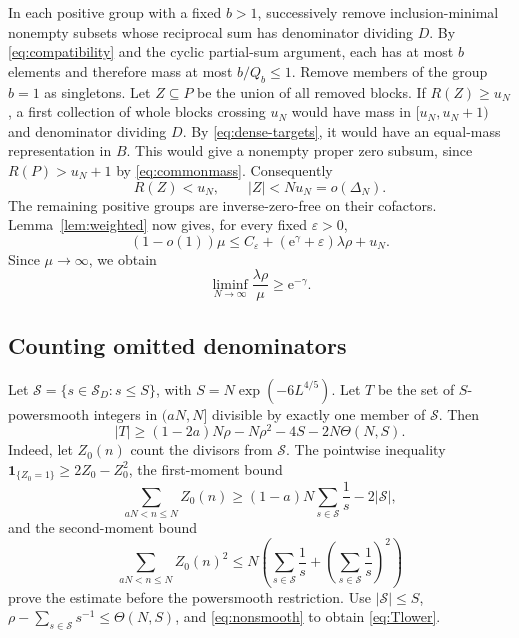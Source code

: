 \documentclass[11pt,leqno]{amsart}
\numberwithin{equation}{section}
\theoremstyle{definition}
\theoremstyle{remark}
\newcommand{\e}{\mathrm e}
\newcommand{\eps}{\varepsilon}
\newcommand{\ind}{\mathbf 1}
\newcommand{\card}[1]{\lvert #1\rvert}
\begin{document}
In each positive group with a fixed $b>1$, successively remove
inclusion-minimal nonempty subsets whose reciprocal sum has denominator
dividing $D$. By \eqref{eq:compatibility} and the cyclic partial-sum
argument, each has at most $b$ elements and therefore mass at most
$b/Q_b\le1$. Remove members of the group $b=1$ as singletons.
Let $Z\subseteq P$ be the union of all removed blocks.
If $R(Z)\ge u_N$, a first collection of whole blocks crossing $u_N$
would have mass in $[u_N,u_N+1)$ and denominator dividing $D$.
By \eqref{eq:dense-targets}, it would have an equal-mass representation
in $B$. This would give a nonempty proper zero subsum, since
$R(P)>u_N+1$ by \eqref{eq:commonmass}.
Consequently
\begin{equation}\label{eq:peeled}
 R(Z)<u_N,\qquad \card Z<Nu_N=o(\Delta_N).
\end{equation}
The remaining positive groups are inverse-zero-free on their cofactors.
Lemma~\ref{lem:weighted} now gives, for every fixed $\eps>0$,
\[
 (1-o(1))\mu\le C_\eps+(\e^\gamma+\eps)\lambda\rho+u_N.
\]
Since $\mu\longrightarrow\infty$, we obtain
\begin{equation}\label{eq:rholower}
 \liminf_{N\to\infty}\frac{\lambda\rho}{\mu}\ge\e^{-\gamma}.
\end{equation}

\subsection{Counting omitted denominators}

Let $\mathcal S=\{s\in\mathcal S_D:s\le S\}$, with
$S=N\exp(-6L^{4/5})$. Let $T$ be the set of $S$-powersmooth integers
in $(aN,N]$ divisible by exactly one member of $\mathcal S$.
Then
\begin{equation}\label{eq:Tlower}
 \card T\ge(1-2a)N\rho-N\rho^2-4S-2N\Theta(N,S).
\end{equation}
Indeed, let $Z_0(n)$ count the divisors from $\mathcal S$.
The pointwise inequality
$\ind_{\{Z_0=1\}}\ge2Z_0-Z_0^2$, the first-moment bound
\[
 \sum_{aN<n\le N}Z_0(n)
 \ge(1-a)N\sum_{s\in\mathcal S}\frac1s-2\card{\mathcal S},
\]
and the second-moment bound
\[
 \sum_{aN<n\le N}Z_0(n)^2
 \le N\left(\sum_{s\in\mathcal S}\frac1s+
                 \left(\sum_{s\in\mathcal S}\frac1s\right)^2\right)
\]
prove the estimate before the powersmooth restriction.
Use $\card{\mathcal S}\le S$,
$\rho-\sum_{s\in\mathcal S}s^{-1}\le\Theta(N,S)$, and
\eqref{eq:nonsmooth} to obtain \eqref{eq:Tlower}.
\end{document}
